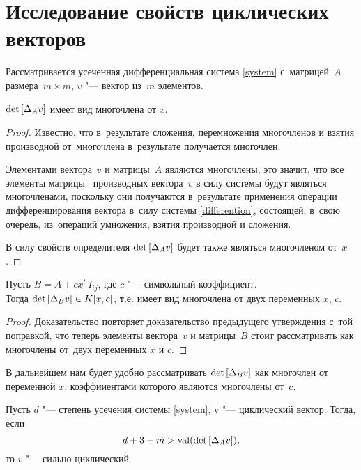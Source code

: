 \section{Исследование свойств циклических векторов}

Рассматривается усеченная дифференциальная система \eqref{system} с~матрицей~$A$ размера~$m \times m$,
$v$ "--- вектор из~$m$ элементов.


\begin{proposition}
    $\mathop{\rm det}\text{$ [\Delta_A v] $}$ имеет вид многочлена от $x$.
\end{proposition}

\begin{proof}
    Известно, что в~результате сложения, перемножения многочленов и взятия производной от~многочлена
    в~результате получается многочлен.
    
    Элементами вектора~$v$ и матрицы~$A$ являются многочлены,
    это значит, что все элементы матрицы \diffMatrix\ производных вектора~$v$ в силу системы
    будут являться многочленами, поскольку они получаются в~результате применения
    операции дифференцирования вектора в~силу системы \eqref{differention},
    состоящей, в~свою очередь, из~операций умножения, взятия производной и сложения.
    
    В силу свойств определителя $\mathop{\rm det}\text{$ [\Delta_A v] $}$ будет также являться многочленом от~$x$.
\end{proof}


\begin{proposition}
    Пусть $B = A + cx^t \, I_{ij}$, где $c$ "--- символьный коэффициент.\\
    Тогда $\mathop{\rm det}\text{$ [\Delta_B v] $} \in K[x, c]$, т.е. имеет вид многочлена от двух переменных $x$, $c$.
\end{proposition}

\begin{proof}
    Доказательство повторяет доказательство предыдущего утверждения с~той поправкой,
    что теперь элементы вектора~$v$ и матрицы~$B$ стоит рассматривать как многочлены от~двух переменных $x$ и $c$.
\end{proof}

В дальнейшем нам будет удобно рассматривать $\mathop{\rm det}\text{$ [\Delta_B v] $}$
как многочлен от переменной $x$, коэффииентами которого являются многочлены от~$c$.


\begin{proposition}
Пусть $d$ "--- степень усечения системы \eqref{system}, v "--- циклический вектор. Тогда, если
\begin{equation}
	d + 3 - m > \mathop{\rm val}(\mathop{\rm det}\text{$ [\Delta_A v] $}),
	\label{d3m}
\end{equation}
то $v$ "--- сильно циклический.

\end{proposition}

